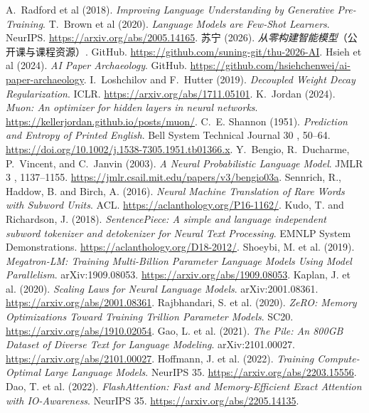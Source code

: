  A.~Radford et al (2018). \emph{Improving Language Understanding by Generative Pre-Training}.
 T.~Brown et al (2020). \emph{Language Models are Few-Shot Learners}. NeurIPS. \url{https://arxiv.org/abs/2005.14165}.
 苏宁 (2026). \emph{从零构建智能模型}（公开课与课程资源）. GitHub. \url{https://github.com/suning-git/thu-2026-AI}.
 Hsieh et al (2024). \emph{AI Paper Archaeology}. GitHub. \url{https://github.com/hsiehchenwei/ai-paper-archaeology}.
 I.~Loshchilov and F.~Hutter (2019). \emph{Decoupled Weight Decay Regularization}. ICLR. \url{https://arxiv.org/abs/1711.05101}.
 K.~Jordan (2024). \emph{Muon: An optimizer for hidden layers in neural networks}. \url{https://kellerjordan.github.io/posts/muon/}.
 C.~E. Shannon (1951). \emph{Prediction and Entropy of Printed English}. Bell System Technical Journal 30 , 50--64. \url{https://doi.org/10.1002/j.1538-7305.1951.tb01366.x}.
 Y.~Bengio, R.~Ducharme, P.~Vincent, and C.~Janvin (2003). \emph{A Neural Probabilistic Language Model}. JMLR 3 , 1137--1155. \url{https://jmlr.csail.mit.edu/papers/v3/bengio03a}.
 Sennrich, R., Haddow, B. and Birch, A. (2016). \emph{Neural Machine Translation of Rare Words with Subword Units}. ACL. \url{https://aclanthology.org/P16-1162/}.
 Kudo, T. and Richardson, J. (2018). \emph{SentencePiece: A simple and language independent subword tokenizer and detokenizer for Neural Text Processing}. EMNLP System Demonstrations. \url{https://aclanthology.org/D18-2012/}.
 Shoeybi, M. et al. (2019). \emph{Megatron-LM: Training Multi-Billion Parameter Language Models Using Model Parallelism}. arXiv:1909.08053. \url{https://arxiv.org/abs/1909.08053}.
 Kaplan, J. et al. (2020). \emph{Scaling Laws for Neural Language Models}. arXiv:2001.08361. \url{https://arxiv.org/abs/2001.08361}.
 Rajbhandari, S. et al. (2020). \emph{ZeRO: Memory Optimizations Toward Training Trillion Parameter Models}. SC20. \url{https://arxiv.org/abs/1910.02054}.
 Gao, L. et al. (2021). \emph{The Pile: An 800GB Dataset of Diverse Text for Language Modeling}. arXiv:2101.00027. \url{https://arxiv.org/abs/2101.00027}.
 Hoffmann, J. et al. (2022). \emph{Training Compute-Optimal Large Language Models}. NeurIPS 35. \url{https://arxiv.org/abs/2203.15556}.
 Dao, T. et al. (2022). \emph{FlashAttention: Fast and Memory-Efficient Exact Attention with IO-Awareness}. NeurIPS 35. \url{https://arxiv.org/abs/2205.14135}.
